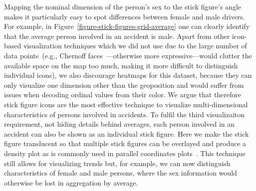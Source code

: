 Mapping the nominal dimension of the person's sex to the stick figure's angle makes it particularly easy to spot differences between female and male drivers. For example, in Figure~\ref{figure-stick-figures-grid-average} one can clearly identify that the average person involved in an accident is male.
Apart from other icon-based visualization techniques which we did not use due to the large number of data points~(e.g., Chernoff faces~\cite{Chernoff1973}---otherwise more expressive---would clutter the available space on the map too much, making it more difficult to distinguish individual icons), we also discourage heatmaps for this dataset, because they can only visualize one dimension other than the geoposition and would suffer from issues when decoding ordinal values from their color.
We argue that therefore stick figure icons are the most effective technique to visualize multi-dimensional characteristics of persons involved in accidents.
To fulfil the third visualizaiton requirement, not hiding details behind averages, each person involved in an accident can also be shown as an individual stick figure. Here we make the stick figure translucent so that multiple stick figures can be overlayed and produce a density plot as is commonly used in parallel coordinates plots~\cite{Wegman1990}.
This technique still allows for visualizing trends but, for example, we can now distinguish characteristics of female and male persons, where the sex information would otherwise be lost in aggregation by average.

